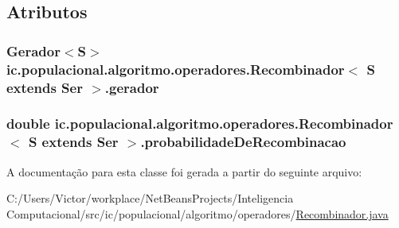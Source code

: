 \subsection{Atributos}
\hypertarget{classic_1_1populacional_1_1algoritmo_1_1operadores_1_1_recombinador_3_01_s_01extends_01_ser_01_4_ab5240079f1ed131d203c9bba3c5fdddd}{
\subsubsection[{gerador}]{\setlength{\rightskip}{0pt plus 5cm}Gerador$<$S$>$ ic.\-populacional.\-algoritmo.\-operadores.\-Recombinador$<$ S extends Ser $>$.gerador\hspace{0.3cm}{\ttfamily [protected]}}}\label{classic_1_1populacional_1_1algoritmo_1_1operadores_1_1_recombinador_3_01_s_01extends_01_ser_01_4_ab5240079f1ed131d203c9bba3c5fdddd}
\hypertarget{classic_1_1populacional_1_1algoritmo_1_1operadores_1_1_recombinador_3_01_s_01extends_01_ser_01_4_a2d53817f5d1454f1c428074bc6c82715}{
\subsubsection[{probabilidade\-De\-Recombinacao}]{\setlength{\rightskip}{0pt plus 5cm}double ic.\-populacional.\-algoritmo.\-operadores.\-Recombinador$<$ S extends Ser $>$.probabilidade\-De\-Recombinacao\hspace{0.3cm}{\ttfamily [protected]}}}\label{classic_1_1populacional_1_1algoritmo_1_1operadores_1_1_recombinador_3_01_s_01extends_01_ser_01_4_a2d53817f5d1454f1c428074bc6c82715}


A documentação para esta classe foi gerada a partir do seguinte arquivo\-:\begin{DoxyCompactItemize}
\item 
C\-:/\-Users/\-Victor/workplace/\-Net\-Beans\-Projects/\-Inteligencia Computacional/src/ic/populacional/algoritmo/operadores/\hyperlink{_recombinador_8java}{Recombinador.\-java}\end{DoxyCompactItemize}
